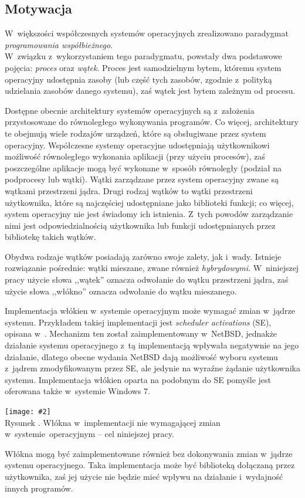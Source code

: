 \documentclass[12pt]{mwart}
\newcounter{figmain}
\newcommand{\myownfigure}[4]{ \newcounter{#1} \setcounter{#1}{\value{figmain}} \addtocounter{figmain}{1} \begin{center} \label{fig:#1} \centering \texttt{[image: \#2]}\\ \nopagebreak[4] Rysunek \arabic{#1}. #3. \end{center}}
\begin{document}
\subsection{Motywacja}
\indent
  W~większości współczesnych systemów operacyjnych zrealizowano paradygmat \emph{programowania współbieżnego}.\\
  W~związku z~wykorzystaniem tego paradygmatu, powstały dwa podstawowe pojęcia: \emph{proces} oraz \emph{wątek}.
  Proces jest samodzielnym bytem, któremu system operacyjny udostępnia zasoby (lub część tych zasobów, zgodnie z~polityką udzielania zasobów
  danego systemu), zaś wątek jest bytem zależnym od procesu.
\par
%
\indent
	Dostępne obecnie architektury systemów operacyjnych są z~założenia przystosowane do równoległego
	wykonywania programów. Co więcej, architektury te obejmują wiele rodzajów urządzeń, które są obsługiwane przez system operacyjny.
	Współczesne systemy operacyjne udostępniają użytkownikowi możliwość równoległego wykonania aplikacji (przy użyciu procesów),
	zaś poszczególne aplikacje mogą być wykonane w~sposób równoległy (podział na podprocesy lub wątki). Wątki zarządzane przez system operacyjny
	zwane są wątkami przestrzeni jądra.
	Drugi rodzaj wątków to wątki przestrzeni użytkownika, które są najczęściej udostępniane jako biblioteki funkcji; co więcej, system operacyjny
	nie jest świadomy ich istnienia. Z~tych powodów zarządzanie nimi jest odpowiedzialnością użytkownika lub funkcji udostępnianych przez
	bibliotekę takich wątków.
\par
%
\indent
	Obydwa rodzaje wątków posiadają zarówno swoje zalety, jak i~wady. Istnieje rozwiązanie pośrednie: wątki mieszane, zwane również
	\emph{hybrydowymi}. W~niniejszej pracy użycie słowa ,,wątek'' oznacza odwołanie do wątku przestrzeni jądra, zaś użycie słowa ,,włókno'' oznacza odwołanie
  do wątku mieszanego.
\par
%
\indent
  Implementacja włókien w~systemie operacyjnym może wymagać zmian w~jądrze systemu.
  Przykładem takiej implementacji jest \emph{scheduler activations} (SE), opisana w~\cite{anderson}.
  Mechanizm ten został zaimplementowany w~NetBSD, jednakże działanie systemu operacyjnego z~tą implementacją wpływała negatywnie na jego działanie, 
  dlatego obecne wydania NetBSD dają możliwość wyboru systemu z~jądrem zmodyfikowanym przez SE, ale jedynie na wyraźne żądanie użytkownika systemu.
  Implementacja włókien oparta na podobnym do SE pomyśle jest oferowana także w~systemie Windows 7.
\par
%
\indent
  \myownfigure{mixedintro}{mixedscheme.png}{Włókna w~implementacji nie wymagającej zmian w~systemie~operacyjnym -- cel niniejszej pracy}{.21}
\par
\indent
  Włókna mogą być zaimplementowane również bez dokonywania zmian w~jądrze systemu operacyjnego.
  Taka implementacja może być biblioteką dołączaną przez użytkownika, zaś jej użycie nie będzie mieć wpływu na działanie i~wydajność innych programów.
\par
%
\end{document}
